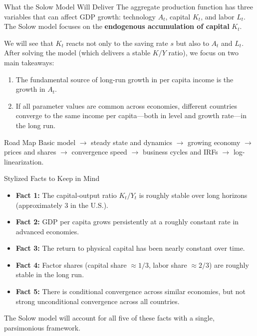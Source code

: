 \documentclass[aspectratio=169,10pt]{beamer}
\begin{document}
\begin{frame}{What the Solow Model Will Deliver}
The aggregate production function has three variables that can affect GDP growth: technology $A_t$, capital $K_t$, and labor $L_t$. The Solow model focuses on the \textbf{endogenous accumulation of capital} $K_t$.

\medskip
We will see that $K_t$ reacts not only to the saving rate $s$ but also to $A_t$ and $L_t$. After solving the model (which delivers a stable $K/Y$ ratio), we focus on two main takeaways:

\begin{enumerate}
  \item The fundamental source of long-run growth in per capita income is the growth in $A_t$.
  \item If all parameter values are common across economies, different countries converge to the same income per capita---both in level and growth rate---in the long run.
\end{enumerate}

\begin{block}{Road Map}
Basic model $\to$ steady state and dynamics $\to$ growing economy $\to$ prices and shares $\to$ convergence speed $\to$ business cycles and IRFs $\to$ log-linearization.
\end{block}
\end{frame}

\begin{frame}{Stylized Facts to Keep in Mind}
\begin{itemize}
  \item \textbf{Fact 1:} The capital-output ratio $K_t/Y_t$ is roughly stable over long horizons (approximately 3 in the U.S.).
  \item \textbf{Fact 2:} GDP per capita grows persistently at a roughly constant rate in advanced economies.
  \item \textbf{Fact 3:} The return to physical capital has been nearly constant over time.
  \item \textbf{Fact 4:} Factor shares (capital share $\approx 1/3$, labor share $\approx 2/3$) are roughly stable in the long run.
  \item \textbf{Fact 5:} There is conditional convergence across similar economies, but not strong unconditional convergence across all countries.
\end{itemize}

\medskip
The Solow model will account for all five of these facts with a single, parsimonious framework.
\end{frame}
\end{document}
